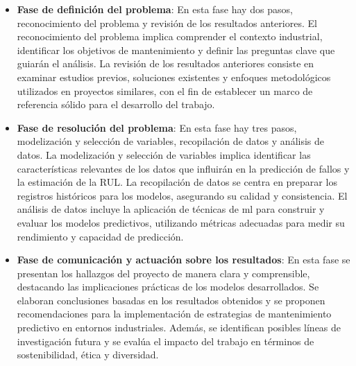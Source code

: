 \documentclass[IB]{TFUOC}
\begin{document}
\begin{itemize}
  \item \textbf{Fase de definición del problema}: En esta fase hay dos pasos, reconocimiento del problema y revisión de
        los resultados anteriores. El reconocimiento del problema implica comprender el contexto industrial, identificar
        los objetivos de mantenimiento y definir las preguntas clave que guiarán el análisis. La revisión de los
        resultados anteriores consiste en examinar estudios previos, soluciones existentes y enfoques metodológicos
        utilizados en proyectos similares, con el fin de establecer un marco de referencia sólido para el desarrollo del
        trabajo.
  \item \textbf{Fase de resolución del problema}: En esta fase hay tres pasos, modelización y selección de variables,
        recopilación de datos y análisis de datos. La modelización y selección de variables implica identificar las
        características relevantes de los datos que influirán en la predicción de fallos y la estimación de la
        \gls{RUL}. La recopilación de datos se centra en preparar los registros históricos para los modelos, asegurando
        su calidad y consistencia. El análisis de datos incluye la aplicación de técnicas de \gls{ml} para construir y
        evaluar los modelos predictivos, utilizando métricas adecuadas para medir su rendimiento y capacidad de
        predicción.
  \item \textbf{Fase de comunicación y actuación sobre los resultados}: En esta fase se presentan los hallazgos del
        proyecto de manera clara y comprensible, destacando las implicaciones prácticas de los modelos desarrollados. Se
        elaboran conclusiones basadas en los resultados obtenidos y se proponen recomendaciones para la implementación
        de estrategias de mantenimiento predictivo en entornos industriales. Además, se identifican posibles líneas de
        investigación futura y se evalúa el impacto del trabajo en términos de sostenibilidad, ética y diversidad.
\end{itemize}
\end{document}
